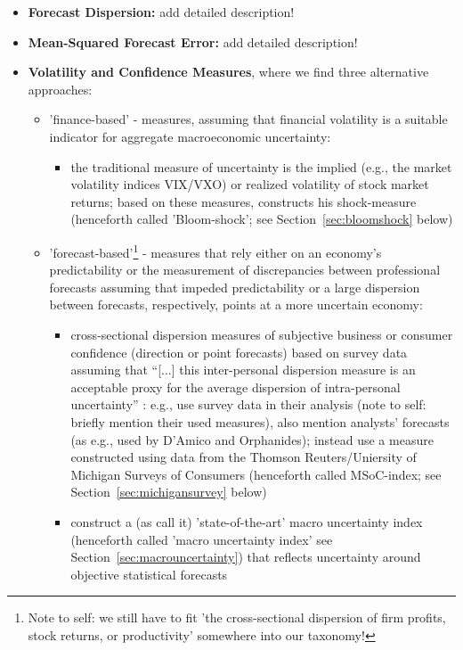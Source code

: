 \documentclass[a4paper,11pt,listof=nochaptergap,oneside,pointednumbers,bibtotoc,bigheadings,liststotoc]{scrbook}
\begin{document}
\begin{itemize}
	\item \textbf{Forecast Dispersion:} add detailed description!
	\item \textbf{Mean-Squared Forecast Error:} add detailed description!
	\item \textbf{Volatility and Confidence Measures}, where we find three alternative approaches:
		\begin{itemize}
			\item 'finance-based' - measures, assuming that financial volatility is a suitable indicator for aggregate macroeconomic uncertainty: 
			\begin{itemize}
				\item the traditional measure of uncertainty is the implied (e.g., the market volatility indices VIX/VXO) or realized volatility of stock market returns; based on these measures, \citet{bloom:09} constructs his shock-measure (henceforth called 'Bloom-shock'; see Section~\ref{sec:bloomshock} below)
			\end{itemize}
			\item 'forecast-based'\footnote{Note to self: we still have to fit 'the cross-sectional dispersion of firm profits, stock returns, or productivity' somewhere into our taxonomy!} - measures that rely either on an economy's predictability or the measurement of discrepancies between professional forecasts assuming that impeded predictability or a large dispersion between forecasts, respectively, points at a more uncertain economy:
			\begin{itemize}
				\item cross-sectional dispersion measures of subjective business or consumer confidence (direction or point forecasts) based on survey data assuming that ``[...] this inter-personal dispersion measure is an acceptable proxy for the average dispersion of intra-personal uncertainty'' \citep[p. 4]{IMF:17}: e.g., \citet{bachmannetal:13} use survey data in their analysis (note to self: briefly mention their used measures), \citet{juradoetal:15} also mention analysts' forecasts (as e.g., used by D'Amico and Orphanides); \citet{leducandliu:16} instead use a measure constructed using data from the Thomson Reuters/Uniersity of Michigan Surveys of Consumers (henceforth called MSoC-index; see Section~\ref{sec:michigansurvey} below)
				\item \citet{juradoetal:15} construct a (as \citet{orlikandveldkamp:14} call it) 'state-of-the-art' macro uncertainty index (henceforth called 'macro uncertainty index' see Section~\ref{sec:macrouncertainty}) that reflects uncertainty around objective statistical forecasts

\end{itemize}
\end{itemize}
\end{itemize}
\end{document}
